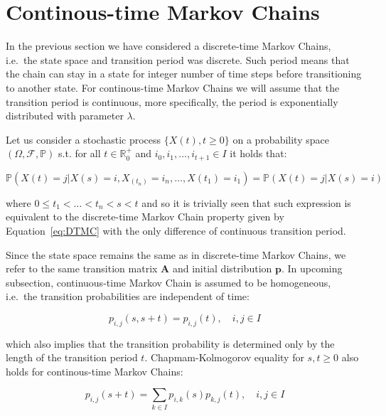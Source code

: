 \section{Continous-time Markov Chains} 

In the previous section we have considered a discrete-time Markov Chains, i.e.\ the state space and transition period was discrete. Such period means that 
the chain can stay in a state for integer number of time steps before transitioning to another state. 
For continous-time Markov Chains we will assume that the transition period is continuous, more specifically, the period is exponentially distributed with parameter $\lambda$.

Let us consider a stochastic process $\{X(t),t \geq 0\}$ on a probability space $(\Omega,\mathcal{F},\mathbb{P})$ s.t. for all $t \in \mathbb{R}_0^+$ and $i_0,i_1,\ldots,i_{t+1} \in I$ it holds that:

\begin{equation}
\mathbb{P}(X(t)=j|X(s)=i, X_(t_n)=i_n,\ldots,X(t_1)=i_1) = \mathbb{P}(X(t)=j|X(s)=i)
\end{equation}

where $0 \leq t_1 < \ldots < t_n < s < t $ and so it is trivially seen that such expression is equivalent to the discrete-time Markov Chain property 
given by Equation~\ref{eq:DTMC} with the only difference of continuous transition period. \citep{Tolver2016}

Since the state space remains the same as in discrete-time Markov Chains, we refer to the same transition matrix $\textbf{A}$ and initial distribution $\textbf{p}$.
In upcoming subsection, continuous-time Markov Chain is assumed to be homogeneous, i.e.\ the transition probabilities are independent of time:

\begin{equation}
p_{i,j}(s,s+t) = p_{i,j}(t), \quad i,j \in I
\end{equation}

which also implies that the transition probability is determined only by the length of the transition period $t$. 
Chapmam-Kolmogorov equality for $s,t \geq 0$ also holds for continous-time Markov Chains:

\begin{equation}
p_{i,j}(s+t) = \sum\limits_{k \in I} p_{i,k}(s) p_{k,j}(t), \quad i,j \in I
\end{equation}

